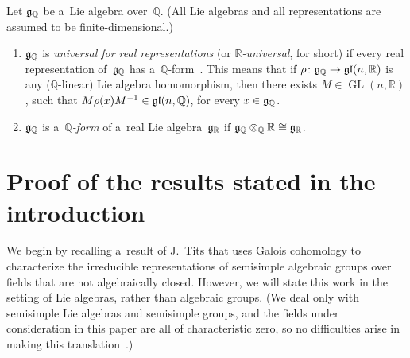 \documentclass[10pt,a4paper]{amsart}
\DeclareMathOperator{\GL}{GL}
\numberwithin{equation}{section}
\newcommand{\Lie}[1]{\mathfrak{\lowercase{#1}}}
\begin{document}
\begin{defn}
Let $\Lie G_\mathbb{Q}$ be a~Lie algebra over~$\mathbb{Q}$.
(All Lie algebras and all representations are assumed to be f\/inite-dimensional.)
\begin{enumerate}\itemsep=0pt
\item $\Lie G_\mathbb{Q}$ is \emph{universal for real representations} (or \emph{$\mathbb{R}$-universal}, for short) if
every real representation of~$\Lie G_\mathbb{Q}$ has a~$\mathbb{Q}$-form~\cite[Def\/inition~7.1]{Morris-RRepsQForms}.
This means that if $\rho \colon \Lie G_\mathbb{Q} \to \Lie{GL}(n,\mathbb{R})$ is any ($\mathbb{Q}$-linear) Lie algebra
homomorphism, then there exists $M \in \GL(n,\mathbb{R})$, such that $M \rho(x) M^{-1} \in \Lie{GL}(n,\mathbb{Q})$, for
every $x \in \Lie G_\mathbb{Q}$.
\item $\Lie G_\mathbb{Q}$ is a~\emph{$\mathbb{Q}$-form} of a~real Lie algebra~$\Lie G_\mathbb{R}$ if $\Lie G_\mathbb{Q}
\otimes_\mathbb{Q} \mathbb{R} \cong \Lie G_\mathbb{R}$.
\end{enumerate}
\end{defn}

\section{Proof of the results stated in the introduction}\label{PfSect}

We begin by recalling a~result of J.~Tits that uses Galois cohomology to characterize the irreducible representations of
semisimple algebraic groups over f\/ields that are not algebraically closed.
However, we will state this work in the setting of Lie algebras, rather than algebraic groups.
(We deal only with semisimple Lie algebras and semisimple groups, and the f\/ields under consideration in this paper are
all of characteristic zero, so no dif\/f\/iculties arise in making this translation~\cite[Proposition~7.3.1(iii), p.~393]{DemazureGrothendieck-SGA3}.)
\end{document}
